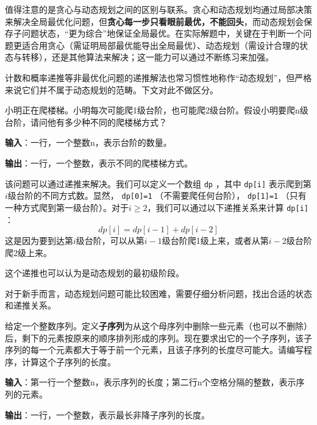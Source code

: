 值得注意的是贪心与动态规划之间的区别与联系。贪心和动态规划均通过局部决策来解决全局最优化问题，但\textbf{贪心每一步只看眼前最优，不能回头}，而动态规划会保存子问题状态，“更为综合”地保证全局最优。在实际解题中，关键在于判断一个问题更适合用贪心（需证明局部最优能导出全局最优）、动态规划（需设计合理的状态与转移），还是其他算法来解决；这一能力可以通过不断练习来加强。

计数和概率递推等非最优化问题的递推解法也常习惯性地称作“动态规划”，但严格来说它们并不属于动态规划的范畴。下文对此不做区分。

\begin{example}
    小明正在爬楼梯。小明每次可能爬1级台阶，也可能爬2级台阶。假设小明要爬n级台阶，请问他有多少种不同的爬楼梯方式？

    \textbf{输入}：一行，一个整数n，表示台阶的数量。

    \textbf{输出}：一行，一个整数，表示不同的爬楼梯方式。
\end{example}

\begin{answer}
    该问题可以通过递推来解决。我们可以定义一个数组 \texttt{dp} ，其中 \texttt{dp[i]} 表示爬到第$i$级台阶的不同方式数。显然， \texttt{dp[0]=1} （不需要爬任何台阶）， \texttt{dp[1]=1} （只有一种方式爬到第一级台阶）。对于$i \geq 2$，我们可以通过以下递推关系来计算 \texttt{dp[i]} ：
    $$dp[i] = dp[i-1] + dp[i-2]$$
    这是因为要到达第$i$级台阶，可以从第$i-1$级台阶爬1级上来，或者从第$i-2$级台阶爬2级上来。

    这个递推也可以认为是动态规划的最初级阶段。
\end{answer}

对于新手而言，动态规划问题可能比较困难，需要仔细分析问题，找出合适的状态和递推关系。

\begin{example}
    给定一个整数序列。定义\textbf{子序列}为从这个母序列中删除一些元素（也可以不删除）后，剩下的元素按原来的顺序排列形成的序列。现在要求出它的一个子序列，该子序列的每一个元素都大于等于前一个元素，且该子序列的长度尽可能大。请编写程序，计算这个子序列的长度。

    \textbf{输入}：第一行一个整数n，表示序列的长度；第二行n个空格分隔的整数，表示序列的元素。

    \textbf{输出}：一行，一个整数，表示最长非降子序列的长度。
\end{example}

